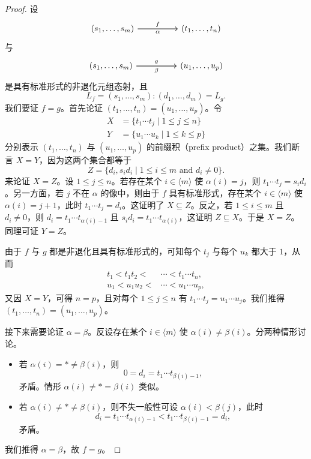 \begin{proof}
    设
    \[\begin{tikzcd}
        (s_1,\dots,s_m) \ar[rr,"f"] \ar[rr,swap,"\alpha"] & & (t_1,\dots,t_n)
    \end{tikzcd}
    \]
    与
    \[\begin{tikzcd}
        (s_1,\dots,s_m) \ar[rr,"g"] \ar[rr,swap,"\beta"] & & (u_1,\dots,u_p)
    \end{tikzcd}
    \]
    是具有标准形式的非退化元组态射，且
    \[
    L_f = (s_1,\dots,s_m):(d_1,\dots,d_m) = L_g.
    \]
    我们要证 $f = g$。首先论证 $(t_1,\dots,t_n) = (u_1,\dots,u_p)$。令
    \begin{align*}
    X & = \{ t_1 \cdots t_j \mid 1 \leq j \leq n\}\\
    Y & = \{u_1\cdots u_k \mid 1 \leq k \leq p\}
    \end{align*}
    分别表示 $(t_1,\dots,t_n)$ 与 $(u_1,\dots,u_p)$ 的前缀积（prefix product）之集。我们断言 $X = Y$，因为这两个集合都等于
    \[
    Z = \{d_i, s_id_i \mid 1 \leq i \leq m \text{ and }d_i \neq 0\}.
    \]
    来论证 $X = Z$。设 $1 \leq j \leq n$。若存在某个 $i \in \langle m \rangle$ 使 $\alpha(i) = j$，则 $t_1 \cdots t_j = s_id_i$。另一方面，若 $j$ 不在 $\alpha$ 的像中，则由于 $f$ 具有标准形式，存在某个 $i \in \langle m \rangle$ 使 $\alpha(i) = j+1$，此时 $t_1 \cdots t_j = d_i$。这证明了 $X \subseteq Z$。反之，若 $1 \leq i \leq m$ 且 $d_i \neq 0$，则 $d_i = t_1 \cdots t_{\alpha(i)-1}$ 且 $s_id_i = t_1 \cdots t_{\alpha(i)}$，这证明 $Z \subseteq X$。于是 $X = Z$。同理可证 $Y = Z$。


    由于 $f$ 与 $g$ 都是非退化且具有标准形式的，可知每个 $t_j$ 与每个 $u_k$ 都大于 $1$，从而
    \begin{align*}
    t_1  < t_1t_2 < & \cdots < t_1\cdots t_n,\\
    u_1  < u_1u_2 < & \cdots < u_1\cdots u_p,
    \end{align*}
    又因 $X = Y$，可得 $n = p$，且对每个 $1 \leq j \leq n$ 有 $t_1 \cdots t_j = u_1 \cdots u_j$。我们推得 $(t_1,\dots,t_n) = (u_1,\dots,u_p)$。

    接下来需要论证 $\alpha = \beta$。反设存在某个 $i \in \langle m \rangle$ 使 $\alpha(i) \neq \beta(i)$。分两种情形讨论。
    \begin{itemize}
        \item 若 $\alpha(i) = * \neq \beta(i)$，则
        \[
        0 = d_i = t_1 \cdots t_{\beta(i)-1},
        \]
        矛盾。情形 $\alpha(i) \neq * = \beta(i)$ 类似。
        \item 若 $\alpha(i) \neq * \neq \beta(i)$，则不失一般性可设 $\alpha(i) < \beta(j)$，此时
        \[
        d_i = t_1 \cdots t_{\alpha(i)-1} < t_1 \cdots t_{\beta(i)-1} = d_i,
        \]
        矛盾。
    \end{itemize}
    我们推得 $\alpha = \beta$，故 $f = g$。
\end{proof}

